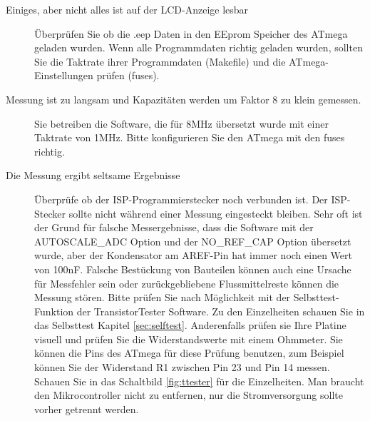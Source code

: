 \begin{description}
\item[Einiges, aber nicht alles ist auf der LCD-Anzeige lesbar] 
\"Uberpr\"ufen Sie ob die .eep Daten in den EEprom Speicher des ATmega geladen wurden.
Wenn alle Programmdaten richtig geladen wurden, sollten Sie die Taktrate ihrer
Programmdaten (Makefile) und die ATmega-Einstellungen pr\"ufen (fuses).

\item[Messung ist zu langsam und Kapazit\"aten werden um Faktor 8 zu klein gemessen.] 
Sie betreiben die Software, die f\"ur 8MHz \"ubersetzt wurde mit einer Taktrate von 1MHz.
Bitte konfigurieren Sie den ATmega mit den fuses richtig.

\item[Die Messung ergibt seltsame Ergebnisse]  
\"Uberpr\"ufe ob der ISP-Programmierstecker noch verbunden ist.
Der ISP-Stecker sollte nicht w\"ahrend einer Messung eingesteckt bleiben.
Sehr oft ist der Grund f\"ur falsche Messergebnisse, dass die Software mit der
 AUTOSCALE\_ADC Option und der NO\_REF\_CAP Option \"ubersetzt wurde, aber der
Kondensator am AREF-Pin hat immer noch einen Wert von 100nF.
Falsche Best\"uckung von Bauteilen k\"onnen auch eine Ursache f\"ur Messfehler sein 
oder zur\"uckgebliebene Flussmittelreste k\"onnen die Messung st\"oren.
Bitte pr\"ufen Sie nach M\"oglichkeit mit der Selbsttest-Funktion der
TransistorTester Software.
Zu den Einzelheiten schauen Sie in das Selbsttest Kapitel \ref{sec:selftest}.
Anderenfalls pr\"ufen sie Ihre Platine visuell und pr\"ufen Sie die Widerstandswerte
mit einem Ohmmeter. Sie k\"onnen die Pins des ATmega f\"ur diese Pr\"ufung benutzen,
zum Beispiel k\"onnen Sie der Widerstand R1 zwischen Pin 23 und Pin 14 messen.
Schauen Sie in das Schaltbild \ref{fig:ttester} f\"ur die Einzelheiten.
Man braucht den Mikrocontroller nicht zu entfernen, nur die Stromversorgung sollte
vorher getrennt werden.

\end{description}

